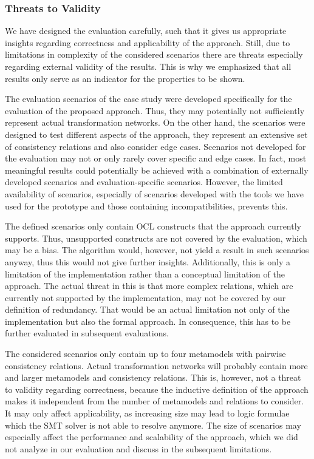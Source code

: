\subsubsection{Threats to Validity}

We have designed the evaluation carefully, such that it gives us appropriate insights regarding correctness and applicability of the approach.
Still, due to limitations in complexity of the considered scenarios there are threats especially regarding external validity of the results.
This is why we emphasized that all results only serve as an indicator for the properties to be shown.

The evaluation scenarios of the case study were developed specifically for the evaluation of the proposed approach.
Thus, they may potentially not sufficiently represent actual transformation networks.
On the other hand, the scenarios were designed to test different aspects of the approach, they represent an extensive set of consistency relations and also consider edge cases.
Scenarios not developed for the evaluation may not or only rarely cover specific and edge cases.
In fact, most meaningful results could potentially be achieved with a combination of externally developed scenarios and evaluation-specific scenarios.
However, the limited availability of scenarios, especially of scenarios developed with the tools we have used for the prototype and those containing incompatibilities, prevents this.

The defined scenarios only contain \gls{OCL} constructs that the approach currently supports.
Thus, unsupported constructs are not covered by the evaluation, which may be a bias.
The algorithm would, however, not yield a result in such scenarios anyway, thus this would not give further insights.
Additionally, this is only a limitation of the implementation rather than a conceptual limitation of the approach.
The actual threat in this is that more complex relations, which are currently not supported by the implementation, may not be covered by our definition of redundancy.
That would be an actual limitation not only of the implementation but also the formal approach.
In consequence, this has to be further evaluated in subsequent evaluations.

The considered scenarios only contain up to four metamodels with pairwise consistency relations.
Actual transformation networks will probably contain more and larger metamodels and consistency relations.
This is, however, not a threat to validity regarding correctness, because the inductive definition of the approach makes it independent from the number of metamodels and relations to consider.
It may only affect applicability, as increasing size may lead to logic formulae which the \gls{SMT} solver is not able to resolve anymore.
The size of scenarios may especially affect the performance and scalability of the approach, which we did not analyze in our evaluation and discuss in the subsequent limitations.

